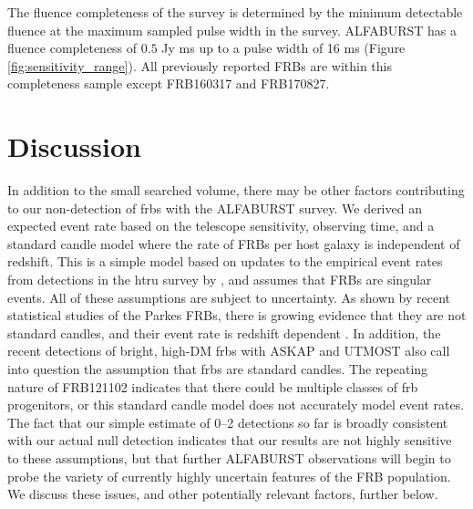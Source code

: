 \documentclass[a4paper,fleqn,usenatbib]{mnras}
\begin{document}


The fluence completeness of the survey \citep{2015MNRAS.447.2852K} is determined
by the minimum detectable fluence at the maximum sampled pulse width in the
survey. ALFABURST has a fluence completeness of $0.5$ Jy ms up to a pulse width
of 16 ms (Figure \ref{fig:sensitivity_range}). All previously reported FRBs are
within this completeness sample except FRB160317 and FRB170827.


\section{Discussion}
\label{sec:discuss}

In addition to the small searched volume, there may be other factors
contributing to our non-detection of \glspl{frb} with the ALFABURST survey. We
derived an expected event rate based on the telescope sensitivity, observing
time, and a standard candle model \citep{2013MNRAS.436L...5L} where the rate of
FRBs per host galaxy is independent of redshift. This is a simple model based on
updates to the empirical event rates from detections in the \gls{htru} survey
\citep{2013Sci...341...53T} by \cite{2016MNRAS.460.3370C}, and assumes that FRBs
are singular events. All of these assumptions are subject to uncertainty. As
shown by recent statistical studies of the Parkes FRBs, there is growing
evidence that they are not  standard candles, and their event rate is redshift
dependent \citep{2016MNRAS.458..708C,ranethesis}.  In addition, the recent
detections of bright, high-DM \glspl{frb} with ASKAP \citep{2017ApJ...841L..12B}
and UTMOST \citep{2017MNRAS.468.3746C,atel10697} also call into question the
assumption that \glspl{frb} are  standard candles.  The repeating nature of
FRB121102 \citep{2016Natur.531..202S} indicates that there could be multiple
classes of \gls{frb} progenitors, or this standard candle model does not
accurately model event rates. The fact that our simple estimate of 0--2
detections so far is broadly consistent with our actual null detection indicates
that our results are not highly sensitive to these assumptions, but that further
ALFABURST observations will begin to probe the variety of currently highly
uncertain features of the FRB population. We discuss these issues, and other
potentially relevant factors, further below.
\end{document}
